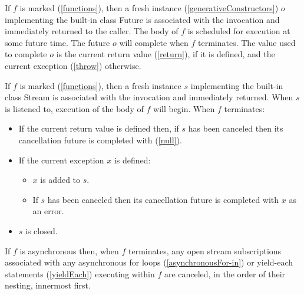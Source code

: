 \documentclass{article}
\newcommand{\code}[1]{{\sf #1}}
\begin{document}
\LMHash{}
If $f$ is marked \ASYNC{} (\ref{functions}), then a fresh instance (\ref{generativeConstructors}) $o$ implementing the built-in class \code{Future} is associated with the invocation and immediately returned to the caller. The body of $f$ is scheduled for execution at some future time. The future $o$ will complete when $f$ terminates. The value used to complete $o$ is the current return value (\ref{return}), if it is defined, and the current exception (\ref{throw}) otherwise. 

\LMHash{}
If $f$ is marked \ASYNC* (\ref{functions}), then a fresh instance $s$ implementing the built-in class \code{Stream} is associated with the invocation and immediately returned. When $s$ is listened to, execution of the body of $f$ will begin.  When $f$ terminates:
\begin{itemize}
\item If the current return value is defined then, if $s$ has been canceled then its cancellation future is completed with \NULL{} (\ref{null}). 
\item If the current exception $x$ is defined:
  \begin{itemize}
  \item $x$ is added to $s$. 
  \item If $s$ has been canceled then its cancellation future is completed with $x$ as an error.
  \end{itemize}
\item $s$ is closed.
\end{itemize}


\LMHash{}
If $f$ is asynchronous then, when $f$ terminates, any open stream subscriptions associated with any asynchronous for loops  (\ref{asynchronousFor-in}) or yield-each statements  (\ref{yieldEach}) executing within $f$ are canceled, in the order of their nesting, innermost first.


\end{document}
